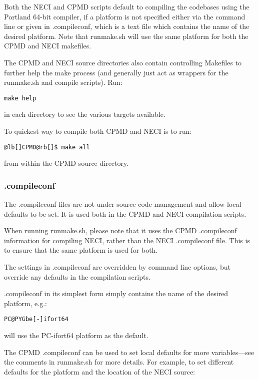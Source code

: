 \documentclass[openany,a4paper,10pt]{manual}
\begin{document}
Both the NECI and CPMD scripts default to compiling the codebases using
the Portland 64-bit compiler, if a platform is not specified either via
the command line or given in .compileconf, which is a text file which
contains the name of the desired platform.  Note that runmake.sh will
use the same platform for both the CPMD and NECI makefiles.

The CPMD and NECI source directories also contain controlling Makefiles
to further help the make process (and generally just act as wrappers
for the runmake.sh and compile scripts).  Run:

\begin{Verbatim}[commandchars=@\[\]]
make help
\end{Verbatim}

in each directory to see the various targets available.

To quickest way to compile both CPMD and NECI is to run:

\begin{Verbatim}[commandchars=@\[\]]
@lb[]CPMD@rb[]$ make all
\end{Verbatim}

from within the CPMD source directory.


\subsubsection{.compileconf}

The .compileconf files are not under source code management and allow local defaults
to be set.  It is used both in the CPMD and NECI compilation scripts.

When running runmake.sh, please note that it uses the CPMD .compileconf information
for compiling NECI, rather than the NECI .compileconf file.  This is to ensure that
the same platform is used for both.

The settings in .compileconf are overridden by command line options, but override
any defaults in the compilation scripts.

.compileconf in its simplest form simply contains the name of the desired
platform, e.g.:

\begin{Verbatim}[commandchars=@\[\]]
PC@PYGbe[-]ifort64
\end{Verbatim}

will use the PC-ifort64 platform as the default.

The CPMD .compileconf can be used to set local defaults for more
variables---see the comments in runmake.sh for more details.  For example, to set
different defaults for the platform and the location of the NECI source:
\end{document}
